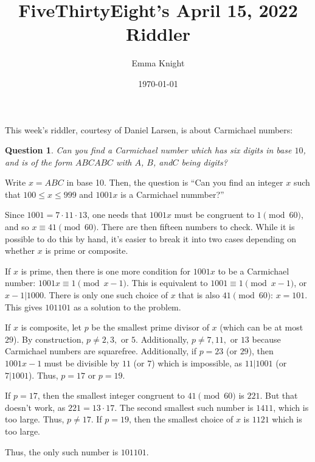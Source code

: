 \documentclass[11pt]{article}
\title{FiveThirtyEight's April 15, 2022 Riddler}
\author{Emma Knight}
\date{\today}
\newtheorem{question}[theorem]{Question}
\theoremstyle{definition}
\begin{document}
\maketitle
This week's riddler,  courtesy of Daniel Larsen,  is about Carmichael numbers:
\begin{question}
Can you find a Carmichael number which has six digits in base $10$,  and is of the form $ABCABC$ with $A$,  $B$,  and$C$ being digits?
\end{question}
Write $x = ABC$ in base 10.   Then,  the question is ``Can you find an integer $x$ such that $100\leq x\leq 999$ and $1001x$ is a Carmichael nummber?''

Since $1001 = 7 \cdot 11\cdot 13$,  one needs that $1001x$ must be congruent to $1 \pmod{60}$,  and so $x \equiv 41 \pmod{60}$.   There are then fifteen numbers to check.   While it is possible to do this by hand,  it's easier to break it into two cases depending on whether $x$ is prime or composite.

If $x$ is prime,  then there is one more condition for $1001x$ to be a Carmichael number: $1001x \equiv 1 \pmod{x-1}$.   This is equivalent to $1001 \equiv 1 \pmod{x-1}$,  or $x-1|1000$.  There is only one such choice of $x$ that is also $41 \pmod{60}$: $x = 101$.   This gives $101101$ as a solution to the problem.

If $x$ is composite,  let $p$ be the smallest prime divisor of $x$ (which can be at most $29$).   By construction,  $p \neq 2, 3,$ or $5$.  Additionally,  $p \neq 7,  11, $ or $13$ because Carmichael numbers are squarefree.   Additionally,  if $p = 23$ (or $29$),  then $1001x-1$ must be divisible by $11$ (or $7$) which is impossible,  as $11|1001$ (or $7|1001$).  Thus,  $p = 17$ or $p = 19$.

If $p = 17$,  then the smallest integer congruent to $41 \pmod{60}$ is $221$.  But that doesn't work,  as $221 = 13\cdot17$.   The second smallest such number is $1411$,  which is too large.   Thus,  $p\neq17$.  If $p = 19$,  then the smallest choice of $x$ is $1121$ which is too large.

Thus,  the only such number is $101101$.
\end{document}

